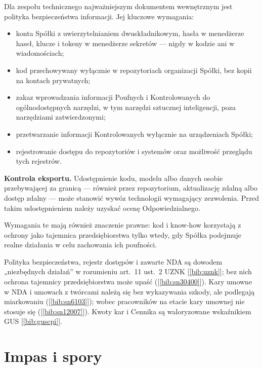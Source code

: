 \documentclass[11pt,a4paper]{report}
\newcommand{\Zr}[1]{[\ref{bib:#1}]}
\begin{document}
\begin{OCoChodzi}
Dla zespołu technicznego najważniejszym dokumentem wewnętrznym jest polityka bezpieczeństwa informacji. Jej kluczowe wymagania:
\begin{itemize}
  \item konta Spółki z uwierzytelnianiem dwuskładnikowym, hasła w menedżerze haseł, klucze i tokeny w menedżerze sekretów --- nigdy w kodzie ani w wiadomościach;
  \item kod przechowywany wyłącznie w repozytoriach organizacji Spółki, bez kopii na kontach prywatnych;
  \item zakaz wprowadzania informacji Poufnych i Kontrolowanych do ogólnodostępnych narzędzi, w tym narzędzi sztucznej inteligencji, poza narzędziami zatwierdzonymi;
  \item przetwarzanie informacji Kontrolowanych wyłącznie na urządzeniach Spółki;
  \item rejestrowanie dostępu do repozytoriów i systemów oraz możliwość przeglądu tych rejestrów.
\end{itemize}
\textbf{Kontrola eksportu.} Udostępnienie kodu, modelu albo danych osobie przebywającej za granicą --- również przez repozytorium, aktualizację zdalną albo dostęp zdalny --- może stanowić wywóz technologii wymagający zezwolenia. Przed takim udostępnieniem należy uzyskać ocenę Odpowiedzialnego.

Wymagania te mają również znaczenie prawne: kod i know-how korzystają z ochrony jako tajemnica przedsiębiorstwa tylko wtedy, gdy Spółka podejmuje realne działania w celu zachowania ich poufności.
\end{OCoChodzi}

\begin{Komentarz}
Polityka bezpieczeństwa, rejestr dostępów i zawarte NDA są dowodem „niezbędnych działań” w rozumieniu art.~11 ust.~2 UZNK \Zr{uznk}; bez nich ochrona tajemnicy przedsiębiorstwa może upaść (\Zr{sn30400}). Kary umowne w NDA i umowach z twórcami należą się bez wykazywania szkody, ale podlegają miarkowaniu (\Zr{sn6103}); wobec pracowników na etacie kary umownej nie stosuje się (\Zr{sn12007}). Kwoty kar i Cennika są waloryzowane wskaźnikiem GUS \Zr{guscpi}.
\end{Komentarz}

\section{Impas i spory}
\end{document}
